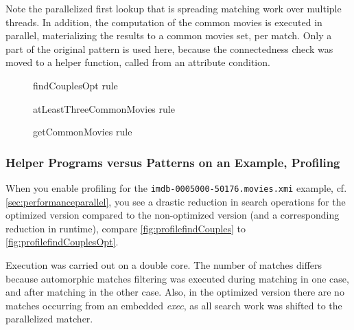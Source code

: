 Note the parallelized first lookup that is spreading matching work over multiple threads.
In addition, the computation of the common movies is executed in parallel, materializing the results to a common movies set, per match.
Only a part of the original pattern is used here, because the connectedness check was moved to a helper function, called from an attribute condition.

\begin{figure}[hptb]
	
	\caption{findCouplesOpt rule}
	\label{fig:findCouplesOpt.grg}
\end{figure}

\begin{figure}[hptb]
	
	\caption{atLeastThreeCommonMovies rule}
	\label{fig:atLeastThreeCommonMovies.grg}
\end{figure}

\begin{figure}[hptb]
	
	\caption{getCommonMovies rule}
	\label{fig:getCommonMovies.grg}
\end{figure}

\pagebreak

\subsubsection*{Helper Programs versus Patterns on an Example, Profiling}

When you enable profiling for the \verb#imdb-0005000-50176.movies.xmi# example, cf. \ref{sec:performanceparallel}, you see a drastic reduction in search operations for the optimized version compared to the non-optimized version (and a corresponding reduction in runtime), compare \ref{fig:profilefindCouples} to \ref{fig:profilefindCouplesOpt}. 

Execution was carried out on a double core.
The number of matches differs because automorphic matches filtering was executed during matching in one case, and after matching in the other case.
Also, in the optimized version there are no matches occurring from an embedded \emph{exec}, as all search work was shifted to the parallelized matcher.

